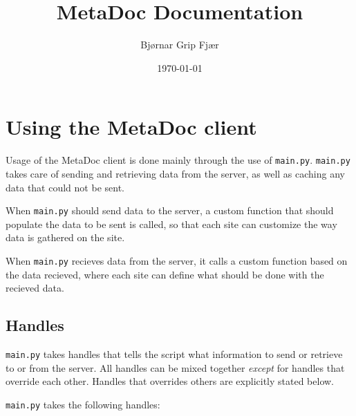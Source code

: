 \documentclass[titlepage, a4paper,10pt]{article}
\title{MetaDoc Documentation}
\author{Bjørnar Grip Fjær}
\date{\today}
\begin{document}
\maketitle

\tableofcontents
\newpage

\section{Using the MetaDoc client}
Usage of the MetaDoc client is done mainly through the use of \texttt{main.py}.
\texttt{main.py} takes care of sending and retrieving data from the server, as
well as caching any data that could not be sent. 

When \texttt{main.py} should send data to the server, a custom function that
should populate the data to be sent is called, so that each site can customize
the way data is gathered on the site. 

When \texttt{main.py} recieves data from the server, it calls a custom function
based on the data recieved, where each site can define what should be done with
the recieved data.

\subsection{Handles}
\label{sec:handles}
\texttt{main.py} takes handles that tells the script what information to send
or retrieve to or from the server. All handles can be mixed together
\textit{except} for handles that override each other. Handles that overrides
others are explicitly stated below.

\texttt{main.py} takes the following handles:
\end{document}
